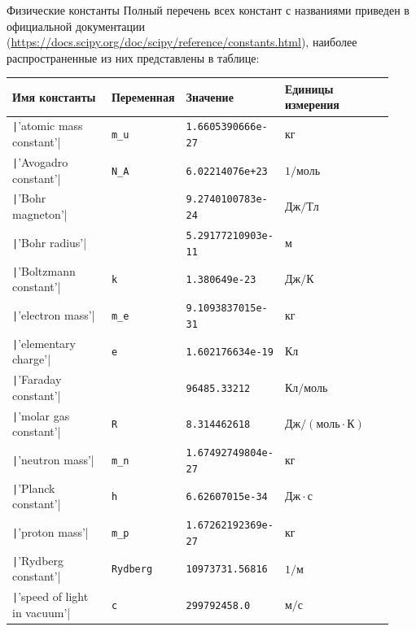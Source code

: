 \documentclass[aspectratio=169, mathserif]{beamer}	%
\begin{document}
\begin{frame}[fragile, label=c]{Физические константы}
\scriptsize
Полный перечень всех констант с названиями приведен в официальной документации  (\url{https://docs.scipy.org/doc/scipy/reference/constants.html}), наиболее распространенные из них представлены в таблице:

\begin{table}[h!]
	\centering
	\label{tab:scipy.constants}

	\begin{tabular*}{\linewidth}{p{0.28\linewidth}p{0.15\linewidth}p{0.2\linewidth}p{0.3\linewidth}}
		\hline
		\textbf{Имя константы}& \textbf{Переменная} & \textbf{Значение} & \textbf{Единицы измерения} \\
		\hline

		\texttt|'atomic mass constant'| & \texttt{m\_u}& \texttt{1.6605390666e-27} & $\mathrm{кг}$ \\
		\texttt|'Avogadro constant'| & \texttt{N\_A}& \texttt{6.02214076e+23} & $\mathrm{1/моль}$ \\
		\texttt|'Bohr magneton'| & & \texttt{9.2740100783e-24} & $\mathrm{Дж/Тл}$ \\
		\texttt|'Bohr radius'| & & \texttt{5.29177210903e-11} & $\mathrm{м}$ \\
		\texttt|'Boltzmann constant'| & \texttt{k} & \texttt{1.380649e-23} & $\mathrm{Дж/К}$ \\
		\texttt|'electron mass'| & \texttt{m\_e} & \texttt{9.1093837015e-31} & $\mathrm{кг}$ \\
		\texttt|'elementary charge'| & \texttt{e} & \texttt{1.602176634e-19} & $\mathrm{Кл}$ \\
		\texttt|'Faraday constant'| &  & \texttt{96485.33212} & $\mathrm{Кл/моль}$ \\
		\texttt|'molar gas constant'| & \texttt{R} & \texttt{8.314462618} & $\mathrm{Дж/(моль \cdot К)}$ \\
		\texttt|'neutron mass'| & \texttt{m\_n} & \texttt{1.67492749804e-27} & $\mathrm{кг}$ \\
		\texttt|'Planck constant'| & \texttt{h} & \texttt{6.62607015e-34} & $\mathrm{Дж \cdot с}$ \\
		\texttt|'proton mass'| & \texttt{m\_p} & \texttt{1.67262192369e-27} & $\mathrm{кг}$ \\
		\texttt|'Rydberg constant'| & \texttt{Rydberg} & \texttt{10973731.56816} & $\mathrm{1/м}$ \\
		\texttt|'speed of light in vacuum'| & \texttt{c} & \texttt{299792458.0} & $\mathrm{м/с}$ \\
		\hline
	\end{tabular*}
\end{table}
\vfill
\end{frame}
\end{document}
